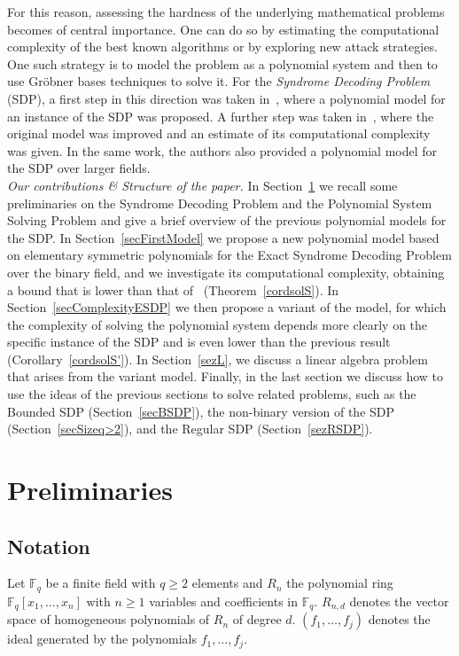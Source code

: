 \documentclass[11pt]{article}
\newcommand{\Fq}[0]{\mathbb{F}_q}
\theoremstyle{plain}
\theoremstyle{definition}
\theoremstyle{remark}
\begin{document}
For this reason, assessing the hardness of the underlying mathematical problems becomes of central importance. One can do so by estimating the computational complexity of the best known algorithms or by exploring new attack strategies. One such strategy is to model the problem as a polynomial system and then to use Gr\"obner bases techniques to solve it. For the \textit{Syndrome Decoding Problem} (SDP), a first step in this direction was taken in~\cite{MPSmodels}, where a polynomial model for an instance of the SDP was proposed. A further step was taken in~\cite{caminata2025quadraticmodelingssyndromedecoding}, where the original model was improved and an estimate of its computational complexity was given. In the same work, the authors also provided a polynomial model for the SDP over larger fields.\\

\noindent\textit{Our contributions \& Structure of the paper.} In Section~\ref{sec:Preliminaries} we recall some preliminaries on the Syndrome Decoding Problem and the Polynomial System Solving Problem and give a brief overview of the previous polynomial models for the SDP. In Section~\ref{secFirstModel} we propose a new polynomial model based on elementary symmetric polynomials for the Exact Syndrome Decoding Problem over the binary field, and we investigate its computational complexity, obtaining a bound that is lower than that of~\cite{caminata2025quadraticmodelingssyndromedecoding} (Theorem~\ref{cordsolS}). In Section~\ref{secComplexityESDP} we then propose a variant of the model, for which the complexity of solving the polynomial system depends more clearly on the specific instance of the SDP and is even lower than the previous result (Corollary~\ref{cordsolS'}).
In Section~\ref{sezL}, we discuss a linear algebra problem that arises from the variant model. Finally, in the last section we discuss how to use the ideas of the previous sections to solve related problems, such as the Bounded SDP (Section~\ref{secBSDP}), the non-binary version of the SDP (Section~\ref{secSizeq>2}), and the Regular SDP (Section~\ref{sezRSDP}).


\section{Preliminaries}\label{sec:Preliminaries}

\subsection{Notation}
Let $\Fq$ be a finite field with $q \geq 2$ elements and $R_n$ the polynomial ring $\Fq[x_1,\dots,x_n]$ with $n \geq 1$ variables and coefficients in $\Fq$. $R_{n,d}$ denotes the vector space of homogeneous polynomials of $R_n$ of degree $d$. $(f_1,\dots,f_j)$ denotes the ideal generated by the polynomials $f_1,\dots,f_j$.
\end{document}
